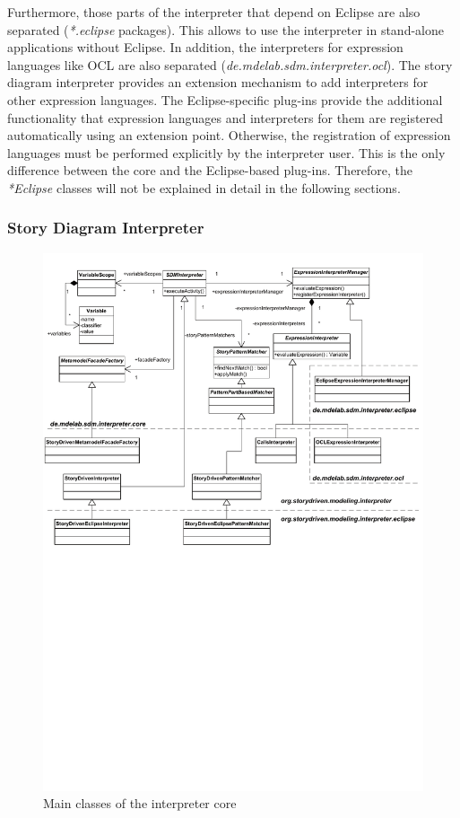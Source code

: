 Furthermore, those parts of the interpreter that depend on Eclipse are also separated (\emph{*.eclipse} packages). 
This allows to use the interpreter in stand-alone applications without Eclipse. 
In addition, the interpreters for expression languages like OCL are also separated (\emph{de.mdelab.sdm.interpreter.ocl}). 
The story diagram interpreter provides an extension mechanism to add interpreters for other expression languages.
The Eclipse-specific plug-ins provide the additional functionality that expression languages and interpreters for them are registered automatically using an extension point.
Otherwise, the registration of expression languages must be performed explicitly by the interpreter user.
This is the only difference between the core and the Eclipse-based plug-ins.
Therefore, the \emph{*Eclipse} classes will not be explained in detail in the following sections.


\subsubsection{Story Diagram Interpreter}
\label{sec:sdm_interpreter}

\begin{figure}[htbp]
  \centering
  \includegraphics[width=1.0\columnwidth]{./figures/interpreter_core.pdf}
  \caption{Main classes of the interpreter core}
  \label{fig:sdm_interpreter}
\end{figure}

